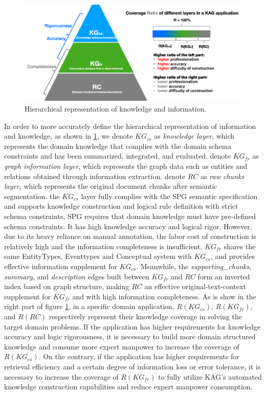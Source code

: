 \documentclass{article}
\begin{document}
 \begin{figure}[htbp]
     \centering
     \includegraphics[width=1\linewidth]{figures/info_know_layer2.png}
     \caption{Hierarchical representation of knowledge and information. }
     \label{fig:hie_know_info}
 \end{figure}

 In order to more accurately define the hierarchical representation of information and knowledge, as shown in \ref{fig:hie_know_info}, we denote $KG_{cs}$ as \textit{knowledge layer}, which represents the domain knowledge that complies with the domain schema constraints and has been summarized, integrated, and evaluated. denote $KG_{fr}$ as \textit{graph information layer}, which represents the graph data such as entities and relations obtained through information extraction. denote $RC$ as \textit{raw chunks layer}, which represents the original document chunks after semantic segmentation. the $KG_{cs}$ layer fully complies with the SPG semantic specification and supports knowledge construction and logical rule definition with strict schema constraints, SPG requires that domain knowledge must have pre-defined schema constraints. It has high knowledge accuracy and logical rigor. However, due to its heavy reliance on manual annotation, the labor cost of construction is relatively high and the information completeness is insufficient. $KG_{fr}$ shares the same EntityTypes, Eventtypes and Conceptual system with $KG_{cs}$, and provides effective information supplement for $KG_{cs}$. Meanwhile, the \textit{supporting\_chunks, summary}, and \textit{description} edges built between $KG_{fr}$ and $RC$ form an inverted index based on graph structure, making $RC$ an effective original-text-context supplement for $KG_{fr}$ and with high information completeness. As is show in the right part of figure \ref{fig:hie_know_info}, in a specific domain application, $R(KG_{cs})$, $R(KG_{fr})$, and $R(RC)$ respectively represent their knowledge coverage in solving the target domain problems. If the application has higher requirements for knowledge accuracy and logic rigorousness, it is necessary to 
 build more domain structured knowledge and consume more expert manpower to increase the coverage of $R(KG_{cs})$. On the contrary, if the application has higher requirements for retrieval efficiency and a certain degree of information loss or error tolerance, it is necessary to increase the coverage of $R(KG_{fr})$ to fully utilize KAG's automated knowledge construction capabilities and reduce expert manpower consumption.
\end{document}
